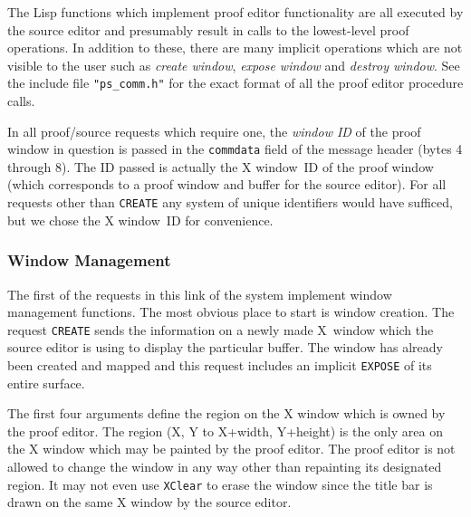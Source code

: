 The Lisp functions which implement proof editor functionality are all
executed by the source editor and presumably result in calls to the
lowest-level proof operations.  In addition to these, there are many
implicit operations which are not visible to the user such as {\it
create window\/}, {\it expose window\/} and {\it destroy
window}. See the include file {\tt "ps\_comm.h"} for the
exact format of all the proof editor procedure calls.

In all proof/source requests which require one, the {\it window ID} of
the proof window in question is passed in the {\tt commdata} field of
the message header (bytes 4 through 8).  The ID passed is actually the
X window~ID of the proof window (which corresponds to a proof window
and buffer for the source editor).  For all requests other than
{\tt CREATE} any system of unique identifiers would have
sufficed, but we chose the X window~ID for convenience.

\subsubsection{Window Management}

The first of the requests in this link of the system implement window
management functions.  The most obvious place to start is window
creation.  The request {\tt CREATE} sends the information on a newly
made X~window which the source editor is using to display the
particular buffer.  The window has already been created and mapped
and this request includes an implicit {\tt EXPOSE} of its entire
surface.

\smallskip
{}
\smallskip

The first four arguments define the region on the X window which is
owned by the proof editor.  The region (X, Y to X+width, Y+height)
is the only area on the X window which may be painted by the proof
editor.  The proof editor is not allowed to change the window in any
way other than repainting its designated region.  It may not even
use {\tt XClear} to erase the window since the title bar is drawn on
the same X window by the source editor.

